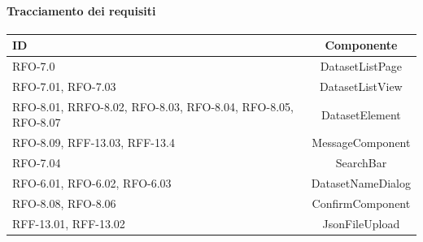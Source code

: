 \paragraph{Tracciamento dei requisiti}
\begin{tabularx}{\textwidth}{|X|c|}
    \hline
    \textbf{ID} & \textbf{Componente} \\
    \hline
        RFO-7.0 & DatasetListPage\\
    \hline
        RFO-7.01, RFO-7.03 & DatasetListView\\
    \hline
        RFO-8.01, RRFO-8.02, RFO-8.03, RFO-8.04, RFO-8.05, RFO-8.07 & DatasetElement\\
    \hline
        RFO-8.09, RFF-13.03, RFF-13.4 & MessageComponent\\
    \hline
        RFO-7.04 & SearchBar\\
    \hline
        RFO-6.01, RFO-6.02, RFO-6.03 & DatasetNameDialog \\
    \hline
        RFO-8.08, RFO-8.06 & ConfirmComponent \\
    \hline
        RFF-13.01, RFF-13.02 & JsonFileUpload \\
    \hline
\end{tabularx}